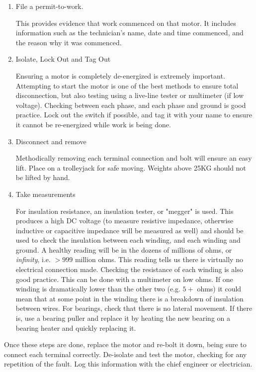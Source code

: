 \documentclass[11pt,a4paper]{article}
\begin{document}
\begin{enumerate}
\item File a permit-to-work.

This provides evidence that work commenced on that motor. It includes information such as the technician's name, date and time commenced, and the reason why it was commenced.
\item Isolate, Lock Out and Tag Out

Ensuring a motor is completely de-energized is extremely important. Attempting to start the motor is one of the best methods to ensure total disconnection, but also testing using a live-line tester or multimeter (if low voltage). Checking between each phase, and each phase and ground is good practice. Lock out the switch if possible, and tag it with your name to ensure it cannot be re-energized while work is being done.
\item Disconnect and remove

Methodically removing each terminal connection and bolt will ensure an easy lift. Place on a trolleyjack for safe moving. Weights above 25KG should not be lifted by hand.

\item Take measurements

For insulation resistance, an insulation tester, or "megger" is used. This produces a high DC voltage (to measure resistive impedance, otherwise inductive or capacitive impedance will be measured as well) and should be used to check the insulation between each winding, and each winding and ground. A healthy reading will be in the dozens of millions of ohms, or \textit{infinity}, i.e. $>999$ million ohms. This reading tells us there is virtually no electrical connection made. Checking the resistance of each winding is also good practice. This can be done with a multimeter on low ohms. If one winding is dramatically lower than the other two (e.g. $5+$ ohms) it could mean that at some point in the winding there is a breakdown of insulation between wires. For bearings, check that there is no lateral movement. If there is, use a bearing puller and replace it by heating the new bearing on a bearing heater and quickly replacing it.
\end{enumerate}
Once these steps are done, replace the motor and re-bolt it down, being sure to connect each terminal correctly. De-isolate and test the motor, checking for any repetition of the fault. Log this information with the chief engineer or electrician.
\newpage
\end{document}
